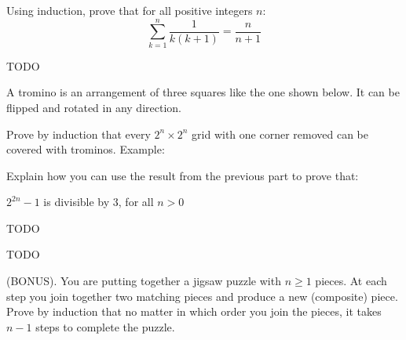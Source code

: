 \documentclass[solution, letterpaper]{cs20inclass}
\begin{document}
\problem

Using induction, prove that for all positive integers $n$:
$$
\sum_{k=1}^{n}\frac{1}{k(k+1)}=\frac{n}{n+1}
$$

\begin{solution}

TODO

\end{solution}

\problem

A tromino is an arrangement of three squares like the one shown below. It can be flipped and rotated in any direction. 


\subproblem

 Prove by induction that every $2^n \times 2^n$ grid with one corner removed can be covered with trominos. Example:

\begin{center}

\end{center}

\subproblem

Explain how you can use the result from the previous part to prove that: 
\begin{center}
$2^{2n}-1$ is divisible by $3$, for all $n>0$
\end{center}

\begin{solution}

\subsolution TODO

\subsolution TODO 

\end{solution}

\problem 

(BONUS). You are putting together a jigsaw puzzle with $n \geq 1$ pieces. At each step you join together two matching pieces and produce a new (composite) piece. Prove by induction that no matter in which order you join the pieces, it takes $n-1$ steps to complete the puzzle. 
\end{document}
